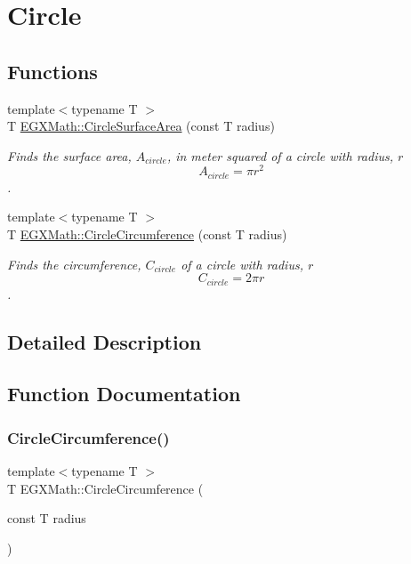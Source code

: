\hypertarget{group___e_g_x_math-_geometry-2_d-_circle}{}\section{Circle}
\label{group___e_g_x_math-_geometry-2_d-_circle}
\subsection*{Functions}
\begin{DoxyCompactItemize}
\item 
{\footnotesize template$<$typename T $>$ }\\T \mbox{\hyperlink{group___e_g_x_math-_geometry-2_d-_circle_gaa4486100a643c57bd7a80c1c11ae3f60}{E\+G\+X\+Math\+::\+Circle\+Surface\+Area}} (const T radius)
\begin{DoxyCompactList}\small\item\em Finds the surface area, $A_{circle}$, in meter squared of a circle with radius, $r$ \[ A_{circle}=\pi r^2 \]. \end{DoxyCompactList}\item 
{\footnotesize template$<$typename T $>$ }\\T \mbox{\hyperlink{group___e_g_x_math-_geometry-2_d-_circle_gadb55695b75a06a3f3534494eb767e18e}{E\+G\+X\+Math\+::\+Circle\+Circumference}} (const T radius)
\begin{DoxyCompactList}\small\item\em Finds the circumference, $C_{circle}$ of a circle with radius, $r$ \[ C_{circle}=2 \pi r \]. \end{DoxyCompactList}\end{DoxyCompactItemize}


\subsection{Detailed Description}


\subsection{Function Documentation}
\mbox{\label{group___e_g_x_math-_geometry-2_d-_circle_gadb55695b75a06a3f3534494eb767e18e}} 
\subsubsection{\texorpdfstring{Circle\+Circumference()}{CircleCircumference()}}
{\footnotesize\ttfamily template$<$typename T $>$ \\
T E\+G\+X\+Math\+::\+Circle\+Circumference (\begin{DoxyParamCaption}\item[{const T}]{radius }\end{DoxyParamCaption})}



